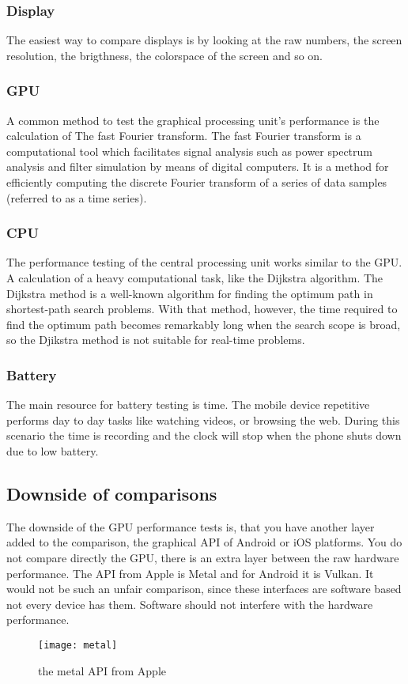 \documentclass[conference, 11pt]{IEEEtran}
\begin{document}
\subsubsection{Display}
The easiest way to compare displays is by looking at the raw numbers, the screen resolution, the brigthness, the colorspace of the screen and so on.

\subsubsection{GPU}
A common method to test the graphical processing unit's performance is the calculation of The fast Fourier transform. \newline
The fast Fourier transform is a computational tool which facilitates signal analysis such as power spectrum analysis and filter simulation by means of digital computers. It is a method for efficiently computing the discrete Fourier transform of a series of data samples (referred to as a time series). \cite{fourier}

\subsubsection{CPU}
The performance testing of the central processing unit works similar to the GPU. A calculation of a heavy computational task, like the Dijkstra algorithm. \newline
The Dijkstra method is a well-known algorithm for finding the optimum path in shortest-path search problems. With that method, however, the time required to find the optimum path becomes remarkably long when the search scope is broad, so the Djikstra method is not suitable for real-time problems.
\cite{dij}

\subsubsection{Battery}
The main resource for battery testing is time. The mobile device repetitive performs day to day tasks like watching videos, or browsing the web. During this scenario the time is recording and the clock will stop when the phone shuts down due to low battery.

\subsection{Downside of comparisons}
The downside of the GPU performance tests is, that you have another layer added to the comparison, the graphical API of Android or iOS platforms. 
You do not compare directly the GPU, there is an extra layer between the raw hardware performance. The API from Apple is Metal and for Android it is Vulkan. It would not be such an unfair comparison, since these interfaces are software based not every device has them. Software should not interfere with the hardware performance.
\begin{figure}[htbp]
\centerline{\texttt{[image: metal]}}
\caption{the metal API from Apple \cite{metal}}
\label{Figure 3}
\end{figure}
\end{document}
